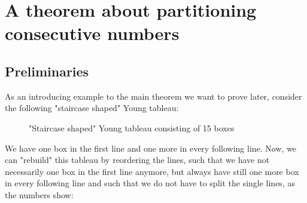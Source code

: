 
\chapter{A theorem about partitioning consecutive numbers} %

\label{Chapter4} %

\section{Preliminaries}
As an introducing example to the main theorem we want to prove later, consider the following "staircase shaped" Young tableau:
\begin{figure}[ht]
\centering
{}
  \caption{"Staircase shaped" Young tableau consisting of 15 boxes}
  \label{figure4:Figure 4}
\end{figure}

We have one box in the first line and one more in every following line. Now, we can "rebuild" this tableau by reordering the lines, such that we have not necessarily one box in the first line anymore, but always have still one more box in every following line and such that we do not have to split the single lines, as the numbers show:

